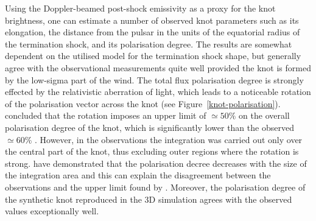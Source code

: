 Using the Doppler-beamed post-shock emissivity as a proxy for the knot brightness, one can estimate a number of observed  knot parameters such as its elongation, the distance from the pulsar in the units of the equatorial radius of the termination shock, and its polarisation degree.     The results are somewhat dependent on the  utilised model for the termination shock shape, but generally agree with the observational measurements quite well provided the knot is formed by the low-sigma part of the wind.  
The total flux polarisation degree is strongly effected by the relativistic aberration of light, which leads to a noticeable rotation of the polarisation vector across the knot (see Figure~\ref{knot-polarisation}).  \citet{YB-15} concluded that the rotation imposes an upper limit 
of $\simeq 50\%$ on the overall polarisation degree of the knot,  which is significantly lower than the observed $\simeq 60\%$ .  However, in the observations the integration was carried out only over the central part of the knot, thus excluding outer regions where the rotation is strong. \citet{LKP-16} have demonstrated that the polarisation decree decreases with the size of the integration area and this can explain the disagreement  between the observations and the upper limit found by \citet{YB-15}.      
Moreover, the polarisation degree of the synthetic knot reproduced in the 3D simulation \citep{porth-14} agrees with the observed values exceptionally well. 